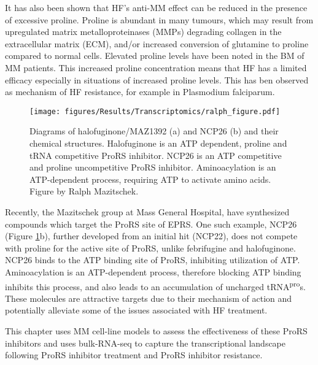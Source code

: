 It has also been shown that HF's anti-MM effect can be reduced in the presence of excessive proline\cite{leiba2012halofuginone}.
Proline is abundant in many tumours, which may result from upregulated matrix metalloproteinases (MMPs) degrading collagen in the extracellular matrix (ECM), and/or increased conversion of glutamine to proline compared to normal cells\cite{liu2013mirna}.
Elevated proline levels have been noted in the BM of MM patients\cite{fei2021metabolic}.
This increased proline concentration means that HF has a limited efficacy especially in situations of increased proline levels.
This has ben observed as mechanism of HF resistance, for example in Plasmodium falciparum\cite{fagbami2019adaptive}.

\begin{figure}[ht]
    \centering
    \texttt{[image: figures/Results/Transcriptomics/ralph\_figure.pdf]}
    \caption[Halofuginone and NCP26 structures]{Diagrams of halofuginone/MAZ1392 (a) and NCP26 (b) and their chemical structures.
    Halofuginone is an ATP dependent, proline and tRNA competitive ProRS inhibitor.
    NCP26 is an ATP competitive and proline uncompetitive ProRS inhibitor.
    Aminoacylation is an ATP-dependent process, requiring ATP to activate amino acids.
    Figure by Ralph Mazitschek.}
    \label{fig:ralph_diagrams}
\end{figure}

Recently, the Mazitschek group at Mass General Hospital, have synthesized compounds which target the ProRS site of EPRS.
One such example, NCP26 (Figure \ref{fig:ralph_diagrams}b), further developed from an initial hit (NCP22)\cite{adachi2017discovery}, does not compete with proline for the active site of ProRS, unlike febrifugine and halofuginone.
NCP26 binds to the ATP binding site of ProRS, inhibiting utilization of ATP\@.
Aminoacylation is an ATP-dependent process, therefore blocking ATP binding inhibits this process, and also leads to an accumulation of uncharged tRNA\textsuperscript{pro}s.
These molecules are attractive targets due to their mechanism of action and potentially alleviate some of the issues associated with HF treatment.


This chapter uses MM cell-line models to assess the effectiveness of these ProRS inhibitors and uses bulk-RNA-seq to capture the transcriptional landscape following ProRS inhibitor treatment and ProRS inhibitor resistance.

\clearpage

